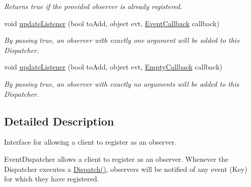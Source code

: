 \begin{DoxyCompactItemize}
\begin{DoxyCompactList}\small\item\em Returns true if the provided observer is already registered. \end{DoxyCompactList}\item 
\hypertarget{interfacestrange_1_1extensions_1_1dispatcher_1_1eventdispatcher_1_1api_1_1_i_event_dispatcher_aa6be925810292c7176d811fe699849e0}{void \hyperlink{interfacestrange_1_1extensions_1_1dispatcher_1_1eventdispatcher_1_1api_1_1_i_event_dispatcher_aa6be925810292c7176d811fe699849e0}{update\-Listener} (bool to\-Add, object evt, \hyperlink{namespacestrange_1_1extensions_1_1dispatcher_1_1eventdispatcher_1_1api_a936e11bc9a4f26a96ede9941cc730e72}{Event\-Callback} callback)}\label{interfacestrange_1_1extensions_1_1dispatcher_1_1eventdispatcher_1_1api_1_1_i_event_dispatcher_aa6be925810292c7176d811fe699849e0}

\begin{DoxyCompactList}\small\item\em By passing true, an observer with exactly one argument will be added to this Dispatcher. \end{DoxyCompactList}\item 
\hypertarget{interfacestrange_1_1extensions_1_1dispatcher_1_1eventdispatcher_1_1api_1_1_i_event_dispatcher_a473a2c08f3eeb0e308f0210e76963f96}{void \hyperlink{interfacestrange_1_1extensions_1_1dispatcher_1_1eventdispatcher_1_1api_1_1_i_event_dispatcher_a473a2c08f3eeb0e308f0210e76963f96}{update\-Listener} (bool to\-Add, object evt, \hyperlink{namespacestrange_1_1extensions_1_1dispatcher_1_1eventdispatcher_1_1api_a4d68e68b31e6e0f733bd72ddcd6111fa}{Empty\-Callback} callback)}\label{interfacestrange_1_1extensions_1_1dispatcher_1_1eventdispatcher_1_1api_1_1_i_event_dispatcher_a473a2c08f3eeb0e308f0210e76963f96}

\begin{DoxyCompactList}\small\item\em By passing true, an observer with exactly no arguments will be added to this Dispatcher. \end{DoxyCompactList}\end{DoxyCompactItemize}


\subsection{Detailed Description}
Interface for allowing a client to register as an observer. 

Event\-Dispatcher allows a client to register as an observer. Whenever the Dispatcher executes a {\ttfamily \hyperlink{interfacestrange_1_1extensions_1_1dispatcher_1_1api_1_1_i_dispatcher_afec6755050bf9891321a7bfd4da1f06b}{Dispatch()}}, observers will be notified of any event (Key) for which they have registered.

